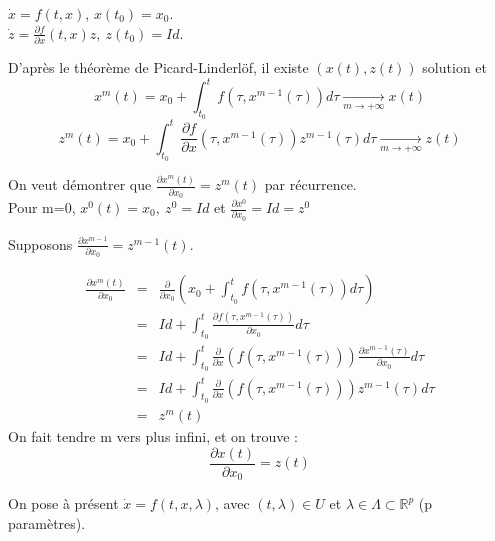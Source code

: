 \begin{dem}
	$\dot{x}=f(t,x)$, $x(t_0)=x_0$. \\
	$\dot{z}=\frac{\partial f}{\partial x} (t,x)z,\ z(t_0)=Id$.

	\bigskip
	D'après le théorème de Picard-Linderlöf, il existe $(x(t),z(t))$ solution et 
	\[x^m(t)=x_0+\int_{t_0}^t f(\tau,x^{m-1}(\tau)) d\tau \xrightarrow[m\to+\infty]{} x(t)\]
	\[z^m(t)=x_0+\int_{t_0}^t \frac{\partial f}{\partial x}(\tau,x^{m-1}(\tau)) z^{m-1}(\tau) d\tau \xrightarrow[m\to+\infty]{} z(t)\]

	On veut démontrer que $\frac{\partial x^m(t)}{\partial x_0}=z^m(t)$ par récurrence.\\
	Pour m=0, $x^0(t)=x_0,\ z^0=Id$ et $\frac{\partial x^0}{\partial x_0}=Id=z^0$

	\bigskip
	Supposons $\frac{\partial x^{m-1}}{\partial x_0}=z^{m-1}(t)$.

	\bigskip
	\begin{eqnarray*}
		\frac{\partial x^m(t)}{\partial x_0}&=&\frac{\partial}{\partial x_0} \left( x_0 + \int_{t_0}^t f(\tau,x^{m-1}(\tau)) d\tau \right) \\
						    &=&Id + \int_{t_0}^t \frac{\partial f(\tau,x^{m-1}(\tau))}{\partial x_0} d\tau\\
					     &=&Id + \int_{t_0}^t \frac{\partial}{\partial x}(f(\tau,x^{m-1}(\tau))) \frac{\partial x^{m-1}(\tau)}{\partial x_0} d\tau \\
					     &=&Id + \int_{t_0}^t \frac{\partial}{\partial x}(f(\tau,x^{m-1}(\tau))) z^{m-1}(\tau) d\tau \\
					     &=&z^{m}(t)
	\end{eqnarray*}
	On fait tendre m vers plus infini, et on trouve : 
	\[\frac{\partial x(t)}{\partial x_0}=z(t)\]
\end{dem}

On pose à présent $\dot{x}=f(t,x,\lambda)$, avec $(t,\lambda)\in U$ et $\lambda\in\Lambda \subset \mathbb{R}^p$ (p paramètres).


